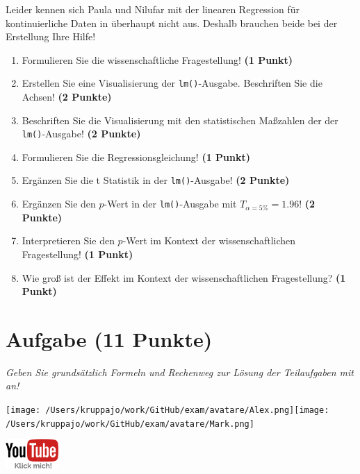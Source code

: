 \documentclass[a4paper, 9pt]{scrartcl}\usepackage[]{graphicx}\usepackage[]{xcolor}
\begin{document}
Leider kennen sich Paula und Nilufar mit der linearen Regression für kontinuierliche Daten in \Rlogo überhaupt nicht aus. Deshalb brauchen beide bei der Erstellung Ihre Hilfe!

\begin{enumerate}
\item Formulieren Sie die wissenschaftliche Fragestellung! \textbf{(1 Punkt)}
\item Erstellen  Sie  eine  Visualisierung  der \texttt{lm()}-Ausgabe.  Beschriften  Sie  die  Achsen! \textbf{(2 Punkte)}
\item Beschriften Sie die Visualisierung mit den statistischen Maßzahlen der der \texttt{lm()}-Ausgabe! \textbf{(2 Punkte)}
\item Formulieren Sie die Regressionsgleichung! \textbf{(1 Punkt)}
\item Ergänzen Sie die t Statistik in der \texttt{lm()}-Ausgabe! \textbf{(2 Punkte)}
\item Ergänzen Sie den $p$-Wert in der \texttt{lm()}-Ausgabe mit $T_{\alpha = 5\%} = 1.96$!  \textbf{(2 Punkte)}
\item Interpretieren Sie den $p$-Wert im Kontext der wissenschaftlichen Fragestellung! \textbf{(1 Punkt)}  
\item Wie groß ist der Effekt im Kontext der wissenschaftlichen Fragestellung? \textbf{(1 Punkt)}
\end{enumerate} 
\clearpage

\section{Aufgabe \hfill (11 Punkte)}

\textit{Geben Sie grundsätzlich Formeln und Rechenweg zur Lösung der Teilaufgaben mit an!} \\[1Ex]
 

 
\begin{minipage}[t]{0.5\textwidth}
\texttt{[image: /Users/kruppajo/work/GitHub/exam/avatare/Alex.png]}\hspace{-4mm}\texttt{[image: /Users/kruppajo/work/GitHub/exam/avatare/Mark.png]}
\end{minipage}
\begin{minipage}[t]{0.5\textwidth}
\hfill
\href{https://youtu.be/tNNzcndrpSk}{\includegraphics[width = 2cm]{img/youtube}}
\end{minipage}
\end{document}
